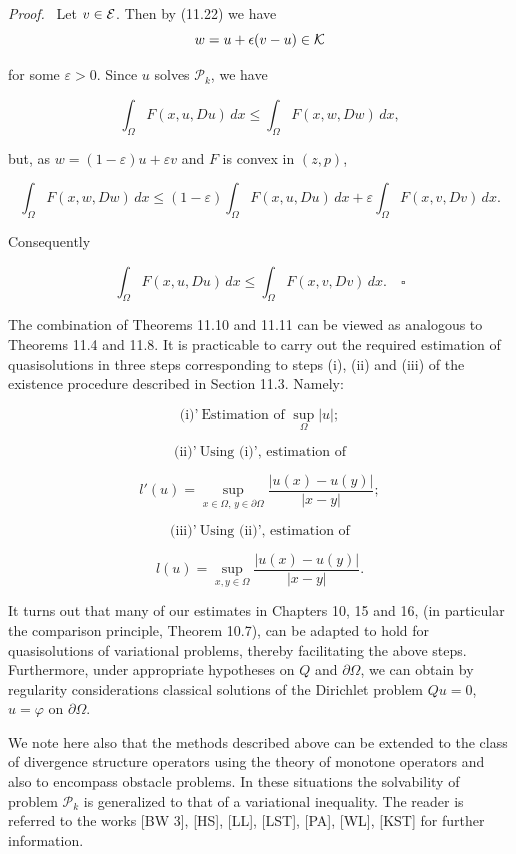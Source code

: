 \emph{Proof.} \ Let $v \in \mathcal{E}$. Then by (11.22) we have
\[
w=u+\epsilon(v-u)\in \mathcal{K}
\]


for some $\varepsilon>0$. Since $u$ solves $\mathscr{P}_k$, we have

\[
\int_{\Omega} F(x,u,Du)\,dx \leq \int_{\Omega} F(x,w,Dw)\,dx,
\]

but, as $w=(1-\varepsilon)u+\varepsilon v$ and $F$ is convex in $(z,p)$,

\[
\int_{\Omega} F(x,w,Dw)\,dx \leq (1-\varepsilon)\int_{\Omega} F(x,u,Du)\,dx+\varepsilon\int_{\Omega} F(x,v,Dv)\,dx.
\]

Consequently

\[
\int_{\Omega} F(x,u,Du)\,dx \leq \int_{\Omega} F(x,v,Dv)\,dx.\quad \square
\]

The combination of Theorems 11.10 and 11.11 can be viewed as analogous to Theorems 11.4 and 11.8. It is practicable to carry out the required estimation of quasisolutions in three steps corresponding to steps (i), (ii) and (iii) of the existence procedure described in Section 11.3. Namely:

\[
\text{(i)'}\ \text{Estimation of }\sup_{\Omega}|u|;
\]

\[
\text{(ii)'}\ \text{Using (i)', estimation of}
\]

\[
l'(u)=\sup_{x\in\Omega,\,y\in\partial\Omega}\frac{|u(x)-u(y)|}{|x-y|};
\]

\[
\text{(iii)'}\ \text{Using (ii)', estimation of}
\]

\[
l(u)=\sup_{x,y\in\Omega}\frac{|u(x)-u(y)|}{|x-y|}.
\]

It turns out that many of our estimates in Chapters 10, 15 and 16, (in particular the comparison principle, Theorem 10.7), can be adapted to hold for quasisolutions of variational problems, thereby facilitating the above steps. Furthermore, under appropriate hypotheses on $Q$ and $\partial\Omega$, we can obtain by regularity considerations classical solutions of the Dirichlet problem $Qu=0$, $u=\varphi$ on $\partial\Omega$.

We note here also that the methods described above can be extended to the class of divergence structure operators using the theory of monotone operators and also to encompass obstacle problems. In these situations the solvability of problem $\mathscr{P}_k$ is generalized to that of a variational inequality. The reader is referred to the works [BW 3], [HS], [LL], [LST], [PA], [WL], [KST] for further information.


